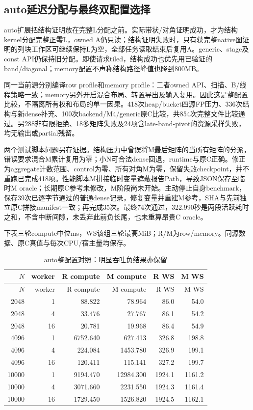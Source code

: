 \documentclass[UTF8,a4paper,11pt]{ctexart}
\begin{document}
\subsection{auto延迟分配与最终双配置选择}
auto扩展把结构证明放在完整L分配之前。实际带状/对角证明成功，才为结构kernel分配完整正零L，owned A仍只读；结构证明失败时，只有获完整native图证明的列块工作区可继续保持L为空，全部任务读取结束后复用A。generic、stage及const API仍保持旧分配。即使请求tiled，结构成功也优先用已验证的band/diagonal；memory配置不声称结构路径峰值也降到800MB。

同一当前源分别编译row profile和memory profile：二者owned API、扫描、B/线程策略一致；memory另外开启混合布局、转置导出及输入复用。因此这是整配置比较，不隔离所有权和布局的单一因果。418次heap/bucket四源FP压力、336次结构与新dense补充、100次backend/M4/generic原C比较，共854次完整文件比较通过。另288非有限拒绝、18多矩阵失败及24项含late-band-pivot的资源采样失败，均无输出或partial残留。

两个测试脚本问题另存证据。结构压力中曾误将M最后矩阵的当所有矩阵的分派，错误要求混合M累计复用为零；小N可合法dense回退，runtime与原C正确。修正为aggregate计数范围、control为零、所有对角M为零，保留失败checkpoint，并不重跑已完成418项。性能脚本M拼接临时变量遮蔽报告Path，导致JSON保存至临时M oracle；长期原C参考未修改，M阶段尚未开始。主动停止自身benchmark，保存39次已逐字节通过的普通dense记录，修复变量并重建M参考，SHA与先前独立原C拼接manifest一致；再完成35次。最终74次通过，322.990秒是两段活跃耗时之和，不含中断间隙，未丢弃此前负长尾，也未重算昂贵C oracle。

下表三轮compute中位ms，WS该组三轮最高MiB；R/M为row/memory。同源数据、原C真值与每次CPU/宿主量均保存。
\begin{longtable}{@{}rr rrrr@{}}
\caption{auto整配置对照：明显吞吐负结果亦保留}\\\toprule
$N$&worker&R compute&M compute&R WS&M WS\\\midrule\endfirsthead
\toprule$N$&worker&R compute&M compute&R WS&M WS\\\midrule\endhead
2048&1&88.822&78.964&86.0&54.0\\
2048&4&33.476&27.767&86.1&54.2\\
2048&16&20.781&19.968&86.4&54.9\\
4096&1&6752.640&627.413&326.8&198.8\\
4096&4&224.084&1453.780&326.9&199.1\\
4096&16&120.411&115.141&327.2&199.7\\
10000&1&9194.470&12984.300&1924.1&1161.2\\
10000&4&3071.660&2231.550&1924.3&1161.4\\
10000&16&1729.450&1526.820&1924.5&1162.1\\
\bottomrule\end{longtable}
\end{document}
